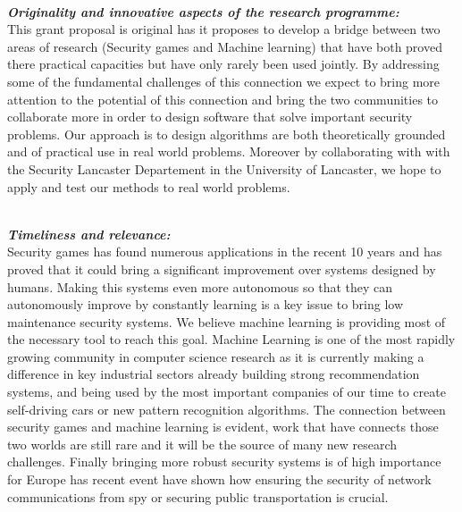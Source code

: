 

\noindent \textbf{\textit{\\Originality and innovative aspects of the research programme:}}\\
This grant proposal is original has it proposes to develop a bridge between two areas of research (Security games and Machine learning) that have both proved there practical capacities but have only rarely been used jointly. By addressing some of the fundamental challenges of this connection we expect to bring more attention to the potential of this connection and bring the two communities to collaborate more in order to design software that solve important security problems.
Our approach is to design algorithms are both theoretically grounded and of practical use in real world problems.
Moreover by collaborating with with the Security Lancaster Departement in the University of Lancaster, we hope to apply and test our methods to real world problems.
 
\noindent \textbf{\textit{\\Timeliness and relevance:}}\\
Security games has found numerous applications in the recent 10 years and has proved that it could bring a significant improvement over  systems designed by humans. Making this systems even more autonomous so that they can autonomously improve by constantly learning is a key issue to bring low maintenance security systems. We believe machine learning is providing most of the necessary tool to reach this goal. Machine Learning is one of the most rapidly growing community in computer science research as it is currently making a difference in key industrial sectors already  building strong recommendation systems, and being used by the most important companies of our time to create self-driving cars or new pattern recognition algorithms.   The connection between security games and machine learning is evident, work that have connects those two worlds are still rare and it will be the source of many new research challenges. 
Finally bringing more robust security systems is of high importance for Europe has recent event have shown how ensuring the security of network communications from spy or securing public transportation is crucial.
 